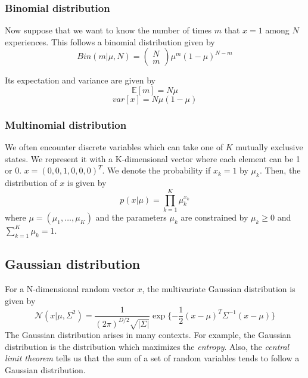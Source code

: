 \subsubsection{Binomial distribution}
Now suppose that we want to know the number of times $m$ that $x=1$ among $N$ experiences. This follows a binomial distribution given by
\begin{equation}
    Bin(m|\mu, N) = \left(\begin{array}{c}
        N \\ m
    \end{array}\right)
    \mu^{m} (1-\mu)^{N-m}
\end{equation}

Its expectation and variance are given by
\begin{equation}
    \mathbb{E}[m] = N\mu
\end{equation}
\begin{equation}
    var[x] = N\mu(1-\mu)
\end{equation}

\subsubsection{Multinomial distribution}
We often encounter discrete variables which can take one of $K$ mutually exclusive states. We represent it with a K-dimensional vector where each element can be 1 or 0. $x = (0, 0, 1, 0, 0, 0)^T$. We denote the probability if $x_k=1$ by $\mu_k$. Then, the distribution of $x$ is given by
\begin{equation}
    p(x|\mu) = \prod_{k=1}^{K} \mu_k^{x_k}
\end{equation}
where $\mu=(\mu_1, \dots, \mu_K)$ and the parameters $\mu_k$ are constrained by $\mu_k \ge 0$ and $\sum_{k=1}^K \mu_k = 1$.

\subsection{Gaussian distribution}
For a N-dimensional random vector $x$, the multivariate Gaussian distribution is given by
\begin{equation}
    \mathcal{N}(x|\mu,\Sigma^2) = \frac{1}{(2\pi)^{D/2}\sqrt{|\Sigma|}} \exp\{-\frac{1}{2}(x-\mu)^T \Sigma^{-1}(x-\mu)\}
\end{equation}
The Gaussian distribution arises in many contexts. For example, the Gaussian distribution is the distribution which maximizes the \textit{entropy}.
Also, the \textit{central limit theorem} tells us that the sum of a set of random variables tends to follow a Gaussian distribution.

